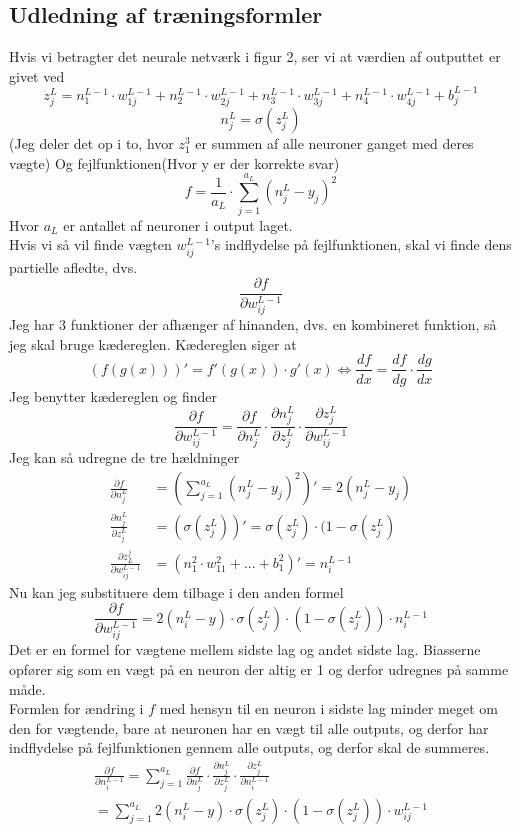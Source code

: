 \subsection{Udledning af træningsformler}

Hvis vi betragter det neurale netværk i figur 2, ser vi at værdien af outputtet er givet ved
$$z^L_j = n^{L-1}_1 \cdot w^{L-1}_{1j} + n^{L-1}_2 \cdot w^{L-1}_{2j} + n^{L-1}_3 \cdot w^{L-1}_{3j} + n^{L-1}_4 \cdot w^{L-1}_{4j} + b^{L-1}_j$$
$$n^L_j = \sigma (z^L_j)$$
(Jeg deler det op i to, hvor $z^3_1$ er summen af alle neuroner ganget med deres vægte)
Og fejlfunktionen(Hvor y er der korrekte svar)
$$f=\frac{1}{a_L} \cdot \sum_{j=1}^{a_L}(n^L_j-y_j)^2$$
Hvor $a_L$ er antallet af neuroner i output laget.\\
Hvis vi så vil finde vægten $w^{L-1}_{ij}$'s indflydelse på fejlfunktionen, skal vi finde dens partielle afledte, dvs.
$$\frac{\partial f}{\partial w^{L-1}_{ij}}$$
Jeg har 3 funktioner der afhænger af hinanden, dvs. en kombineret funktion, så jeg skal bruge kædereglen. 
Kædereglen siger at 
$$(f(g(x)))' = f'(g(x)) \cdot g'(x) \Leftrightarrow \frac{df}{dx} = \frac{df}{dg}\cdot \frac{dg}{dx}$$
Jeg benytter kædereglen og finder
$$\frac{\partial f}{\partial w^{L-1}_{ij}} = \frac{\partial f}{\partial n^L_j} \cdot \frac{\partial n^L_j}{\partial z^L_j} \cdot \frac{\partial z^L_j}{\partial w^{L-1}_{ij}}$$
Jeg kan så udregne de tre hældninger
\begin{align*}
        \frac{\partial f}{\partial n^L_j} & = \left( \sum_{j=1}^{a_L}(n^L_j-y_j)^2 \right) ' = 2(n^L_j-y_j)\\
        \frac{\partial n^L_j}{\partial z^L_j} & = (\sigma (z^L_j))' = \sigma (z^L_j) \cdot (1-\sigma (z^L_j) \\
        \frac{\partial z_L^j}{\partial w^{L-1}_{ij}} & = (n^2_1 \cdot w^2_{11} + ... + b_1^2)' = n^{L-1}_{i}
\end{align*}
Nu kan jeg substituere dem tilbage i den anden formel
$$\frac{\partial f}{\partial w^{L-1}_{ij}} = 2(n^L_i-y) \cdot \sigma (z^L_j) \cdot (1-\sigma (z^L_j)) \cdot n^{L-1}_i$$
Det er en formel for vægtene mellem sidste lag og andet sidste lag. Biasserne opfører sig som en vægt på en neuron der altig er 1 og derfor udregnes på samme måde.\\
Formlen for ændring i $f$ med hensyn til en neuron i sidste lag minder meget om den for vægtende, bare at neuronen har en vægt til alle outputs, og derfor har indflydelse på
fejlfunktionen gennem alle outputs, og derfor skal de summeres.
\begin{multline*}
        \frac{\partial f}{\partial n^{L-1}_i} = \sum_{j=1}^{a_L} \frac{\partial f}{\partial n^L_j} \cdot \frac{\partial n^L_j}{\partial z^L_j} \cdot \frac{\partial z^L_j}{\partial n^{L-1}_i} \\
        = \sum_{j=1}^{a_L} 2(n^L_i-y) \cdot \sigma (z^L_j) \cdot (1-\sigma (z^L_j)) \cdot w^{L-1}_{ij}
\end{multline*}
